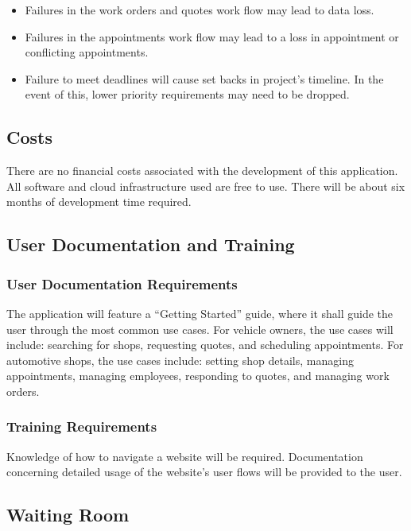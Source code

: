 \documentclass[12pt]{article}
\begin{document}
\begin{itemize}
	\item Failures in the work orders and quotes work flow may lead to data loss.
	\item Failures in the appointments work flow may lead to a loss in appointment or conflicting
	      appointments.
	\item Failure to meet deadlines will cause set backs in project's timeline. In the event of this, lower
	      priority requirements may need to be dropped.
\end{itemize}

\subsection{Costs}

There are no financial costs associated with the development of this application. All software and
cloud infrastructure used are free to use. There will be about six months of development time
required.

\subsection{User Documentation and Training}
\subsubsection{User Documentation Requirements}

The application will feature a ``Getting Started'' guide, where it shall guide the user through the
most common use cases. For vehicle owners, the use cases will include: searching for shops,
requesting quotes, and scheduling appointments. For automotive shops, the use cases include:
setting shop details, managing appointments, managing employees, responding to quotes, and managing
work orders.

\subsubsection{Training Requirements}

Knowledge of how to navigate a website will be required. Documentation concerning detailed usage of
the website's user flows will be provided to the user.

\subsection{Waiting Room}
\end{document}
